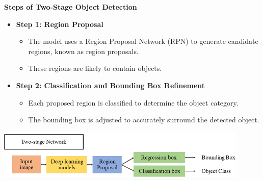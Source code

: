 \documentclass{beamer}
\begin{document}
\begin{frame}{\textbf{Steps of Two-Stage Object Detection}}
  \begin{itemize}
    \item \textbf{Step 1: Region Proposal}
    \begin{itemize}
      \item The model uses a Region Proposal Network (RPN) to generate candidate regions, known as region proposals.
      \item These regions are likely to contain objects.
    \end{itemize}
    
    \item \textbf{Step 2: Classification and Bounding Box Refinement}
    \begin{itemize}
      \item Each proposed region is classified to determine the object category.
      \item The bounding box is adjusted to accurately surround the detected object.
    \end{itemize}
  \end{itemize}
  
  \vfill
  \begin{center}
    \includegraphics[width=0.9\textwidth]{slide3.png}
  \end{center}
\end{frame}
\end{document}
